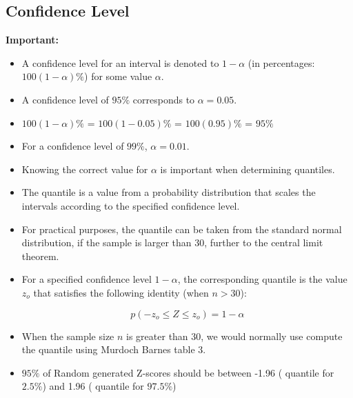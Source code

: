 \documentclass[]{report}
\begin{document}
\subsection*{Confidence Level  }
\textbf{Important:}
\begin{itemize}
\item A confidence level for an interval is denoted to $1-\alpha$ (in percentages: $100(1-\alpha)\%$) for some value $\alpha$. \smallskip
\item A confidence level of $95\%$ corresponds to $\alpha = 0.05$. \smallskip
\item $100(1-\alpha)\%$ = $100(1-0.05)\%$  = $100(0.95)\%$ = $95\%$ \smallskip
\item For a confidence level of $99\%$, $\alpha = 0.01$. \smallskip
\item Knowing the correct value for $\alpha$ is important when determining quantiles.
\end{itemize}



\begin{itemize}
\item The quantile is a value from a probability distribution that scales the intervals according to the specified confidence level.
\item For practical purposes, the quantile can be taken from the standard normal distribution, if the sample is larger than 30, further to the central limit theorem.
\item For a specified confidence level $1-\alpha $, the corresponding quantile is the value $z_o$ that satisfies the following identity (when $n > 30$):

\[ p( -z_o \leq Z \leq z_o) = 1- \alpha \]

\end{itemize}




\begin{itemize} \item When the sample size $n$ is greater than 30, we would normally use compute the quantile using Murdoch Barnes table 3.


\item $95\%$ of Random generated Z-scores should be between -1.96 ( quantile for $2.5\%$) and 1.96 ( quantile for $97.5\%$)
\end{itemize}
\end{document}
